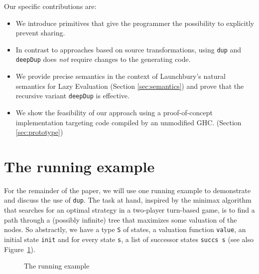 \documentclass[preprint]{sigplanconf}
\theoremstyle{nonumberplain}
\newcommand{\li}{\lstinline[style=Haskell]}
\begin{document}
Our specific contributions are:
\begin{itemize}
\item We introduce primitives that give the programmer the possibility to explicitly prevent sharing.
\item In contrast to approaches based on source transformations, using \li-dup- and \li-deepDup- does \emph{not} require changes to the generating code.
\item We provide precise semantics in the context of Launchbury’s natural semantics for Lazy Evaluation (Section \ref{sec:semantics}) and prove that the recursive variant \li-deepDup- is effective.
\item We show the feasibility of our approach using a proof-of-concept implementation targeting code compiled by an unmodified GHC. (Section \ref{sec:prototype})
\end{itemize}

\pagebreak[3]
\section{The running example}
\label{sec:example}

For the remainder of the paper, we will use one running example to demonstrate and discuss the use of \li-dup-. The task at hand, inspired by the minimax algorithm that searches for an optimal strategy in a two-player turn-based game, is to find a path through a (possibly infinite) tree that maximizes some valuation of the nodes. So abstractly, we have a type \li-S- of states, a valuation function \li-value-, an initial state \li-init- and for every state \li-s-, a list of successor states \li-succs s- (see also Figure~\ref{fig:ex}).

\begin{figure}
\caption{The running example}
\label{fig:ex}
\end{figure}
\end{document}
